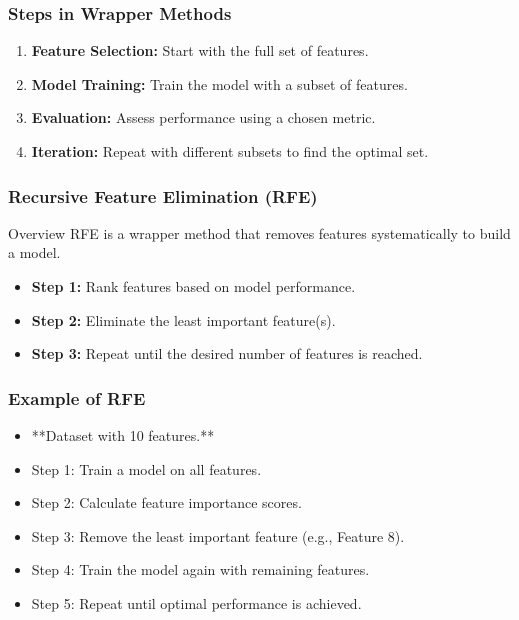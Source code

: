 \documentclass[aspectratio=169]{beamer}
\begin{document}
\begin{frame}[fragile]
    \frametitle{Steps in Wrapper Methods}
    \begin{enumerate}
        \item \textbf{Feature Selection:} Start with the full set of features.
        \item \textbf{Model Training:} Train the model with a subset of features.
        \item \textbf{Evaluation:} Assess performance using a chosen metric.
        \item \textbf{Iteration:} Repeat with different subsets to find the optimal set.
    \end{enumerate}
\end{frame}

\begin{frame}[fragile]
    \frametitle{Recursive Feature Elimination (RFE)}
    \begin{block}{Overview}
        RFE is a wrapper method that removes features systematically to build a model.
    \end{block}
    \begin{itemize}
        \item \textbf{Step 1:} Rank features based on model performance.
        \item \textbf{Step 2:} Eliminate the least important feature(s).
        \item \textbf{Step 3:} Repeat until the desired number of features is reached.
    \end{itemize}
\end{frame}

\begin{frame}[fragile]
    \frametitle{Example of RFE}
    \begin{itemize}
        \item **Dataset with 10 features.**
        \item Step 1: Train a model on all features.
        \item Step 2: Calculate feature importance scores.
        \item Step 3: Remove the least important feature (e.g., Feature 8).
        \item Step 4: Train the model again with remaining features.
        \item Step 5: Repeat until optimal performance is achieved.
    \end{itemize}
\end{frame}
\end{document}
